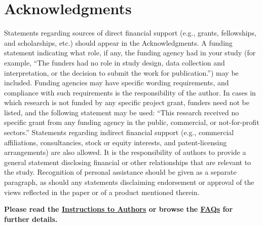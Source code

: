 \documentclass[lineno]{asm-article}
\begin{document}
\section{Acknowledgments}
Statements regarding sources of direct financial support (e.g., grants, fellowships, and scholarships, etc.) should appear in the Acknowledgments. A funding statement indicating what role, if any, the funding agency had in your study (for example, ``The funders had no role in study design, data collection and interpretation, or the decision to submit the work for publication.'') may be included. Funding agencies may have specific wording requirements, and compliance with such requirements is the responsibility of the author. In cases in which research is not funded by any specific project grant, funders need not be listed, and the following statement may be used: ``This research received no specific grant from any funding agency in the public, commercial, or not-for-profit sectors.'' Statements regarding indirect financial support (e.g., commercial affiliations, consultancies, stock or equity interests, and patent-licensing arrangements) are also allowed. It is the responsibility of authors to provide a general statement disclosing financial or other relationships that are relevant to the study.  Recognition of personal assistance should be given as a separate paragraph, as should any statements disclaiming endorsement or approval of the views reflected in the paper or of
a product mentioned therein.


\textbf{Please read the \href{http://journalitas.asm.org/t/175157-msystems-ita}{Instructions to Authors} or browse the \href{http://msystems.asm.org/content/faq}{FAQs} for further details.} 


\end{document}
